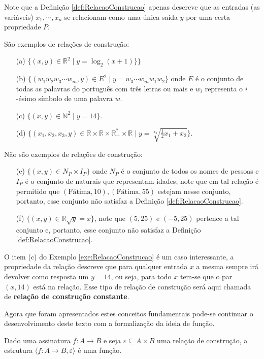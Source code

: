 Note que a Definição \ref{def:RelacaoConstrucao} apenas descreve que as entradas (as variáveis) $x_1, \cdots, x_n$ se relacionam como uma única saída $y$ por uma certa propriedade $P$.

\begin{example}\label{exe:RelacaoConstrucao}
	São exemplos de relações de construção:
	\begin{itemize}
		\item[(a)] $\{(x, y) \in \mathbb{R}^2 \mid y = \log_2(x + 1)\}\}$
		\item[(b)] $\{(w_1w_2w_3\cdots w_m, y) \in E^2 \mid y = w_3\cdots w_mw_1w_2\}$ onde $E$ é o conjunto de todas as palavras do português com três letras ou mais e $w_i$ representa o $i$-ésimo símbolo de uma palavra $w$.
		\item[(c)] $\{(x, y) \in \mathbb{N}^2 \mid y = 14\}$.
		\item[(d)] $\Big\{(x_1, x_2, x_3, y) \in \mathbb{R} \times \mathbb{R} \times \mathbb{R}^*_+ \times \mathbb{R} \mid y = \sqrt[x_3]{\displaystyle\frac{1}{2}x_1 + x_2}\Big\}$.
	\end{itemize}
	Não são exemplos de relações de construção:
	\begin{itemize}
		\item[(e)] $\{(x, y) \in N_P \times I_P\}$ onde $N_P$ é o conjunto de todos os nomes de pessoas e $I_P$ é o conjunto de naturais que representam idades, note que em tal relação é permitido que $(\text{Fátima}, 10), (\text{Fátima}, 55)$ estejam nesse conjunto, portanto, esse conjunto não satisfaz a Definição \ref{def:RelacaoConstrucao}.
		\item[(f)] $\{(x, y) \in \mathbb{R} \sqrt{y} = x\}$, note que $(5, 25)$ e $(-5, 25)$ pertence a tal conjunto e, portanto, esse conjunto não satisfaz a Definição \ref{def:RelacaoConstrucao}.
	\end{itemize}
\end{example}

\begin{remark}
	O item (c) do Exemplo \ref{exe:RelacaoConstrucao} é um caso interessante, a propriedade da relação descreve que para qualquer entrada $x$ a mesma sempre irá devolver como resposta um $y = 14$, ou seja, para todo $x$ tem-se que o par $(x, 14)$ está na relação. Esse tipo de relação de construção será aqui chamada de \textbf{relação de construção constante}.    
\end{remark}

Agora que foram apresentados estes conceitos fundamentais pode-se continuar o desenvolvimento deste texto com a formalização da ideia de função.

\begin{definition}[Função]
	Dado uma assinatura $f: A \rightarrow B$ e seja $\varepsilon \subseteq A \times B$ uma relação de construção, a estrutura $\langle f: A \rightarrow B, \varepsilon \rangle$ é uma função.
\end{definition}

